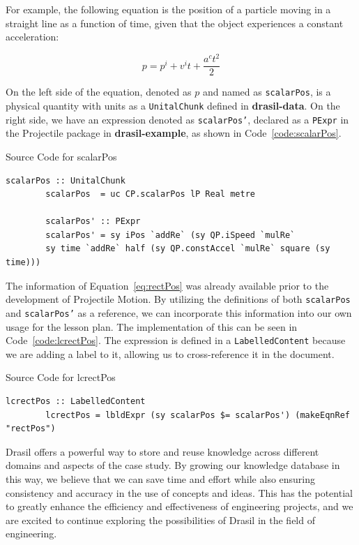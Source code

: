 For example, the following equation is the position of a particle moving in a 
straight line as a function of time, given that the object experiences a 
constant acceleration:

\begin{equation}
	\label{eq:rectPos}
	p=p^i+v^it+\frac{a^ct^2}{2}
\end{equation}

On the left side of the equation, denoted as $p$ and named as 
\texttt{scalarPos}, is a physical quantity with units as a \texttt{UnitalChunk} 
defined in \textbf{drasil-data}. On the right side, we have an expression 
denoted as \texttt{scalarPos'}, declared as a \texttt{PExpr} in the Projectile 
package in \textbf{drasil-example}, as shown in Code~\ref{code:scalarPos}. 

\begin{listing}[h!]
	\caption{Source Code for scalarPos} 
	\label{code:scalarPos}
	\begin{lstlisting}[language=haskell1]		
		scalarPos :: UnitalChunk
		scalarPos  = uc CP.scalarPos lP Real metre
		
		scalarPos' :: PExpr
		scalarPos' = sy iPos `addRe` (sy QP.iSpeed `mulRe` 
		sy time `addRe` half (sy QP.constAccel `mulRe` square (sy time)))
	\end{lstlisting}
\end{listing}

The information of Equation~\ref{eq:rectPos} was already available prior to 
the development of Projectile Motion. By utilizing the definitions of both 
\texttt{scalarPos} and \texttt{scalarPos'} as a reference, we can incorporate 
this information into our own usage for the lesson plan. The implementation of 
this can be seen in Code~\ref{code:lcrectPos}. The expression is defined in a 
\texttt{LabelledContent} because we are adding a label to it, allowing us to 
cross-reference it in the document.

\begin{listing}[h!]
	\caption{Source Code for lcrectPos} 
	\label{code:lcrectPos}
	\begin{lstlisting}[language=haskell1]		
		lcrectPos :: LabelledContent
		lcrectPos = lbldExpr (sy scalarPos $= scalarPos') (makeEqnRef "rectPos")
	\end{lstlisting}
\end{listing}

Drasil offers a powerful way to store and reuse knowledge across different 
domains and aspects of the case study. By growing our knowledge database in 
this way, we believe that we can save time and effort while also ensuring 
consistency and accuracy in the use of concepts and ideas. This has the 
potential to greatly enhance the efficiency and effectiveness of engineering 
projects, and we are excited to continue exploring the possibilities of Drasil 
in the field of engineering.